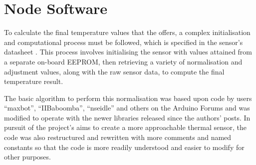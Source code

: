 \documentclass[../thesis/thesis.tex]{subfiles}
\begin{document}
\section{Node Software}

To calculate the final temperature values that the \mlx offers, a complex initialisation and computational process must be followed, which is specified in the sensor's datasheet \cite{MLXDatasheet}. This process involves initialising the sensor with values attained from a separate on-board \iic EEPROM, then retrieving a variety of normalisation and adjustment values, along with the raw sensor data, to compute the final temperature result.

The basic algorithm to perform this normalisation was based upon code by users ``maxbot'', ``IIBaboomba'', ``nseidle'' and others on the Arduino Forums \cite{ArduinoForum} and was modified to operate with the newer \ard \iic libraries released since the authors' posts. In pursuit of the project's aims to create a more approachable thermal sensor, the code was also restructured and rewritten with more comments and named constants so that the code is more readily understood and easier to modify for other purposes.
 
\end{document}
